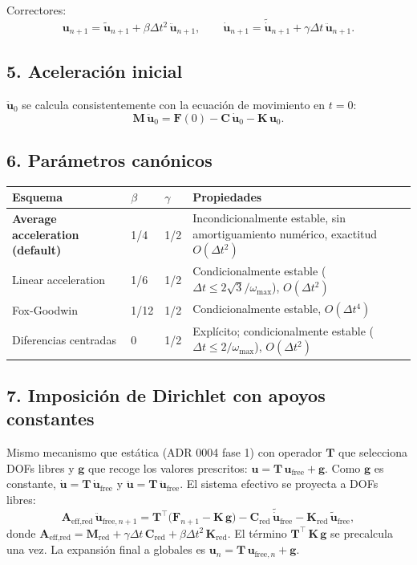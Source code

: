 \documentclass[11pt,letterpaper,oneside]{report}
\begin{document}
Correctores:
\[
\mathbf u_{n+1} = \tilde{\mathbf u}_{n+1} + \beta\Delta t^2\,\ddot{\mathbf u}_{n+1}, \qquad
  \dot{\mathbf u}_{n+1} = \tilde{\dot{\mathbf u}}_{n+1} + \gamma\Delta t\,\ddot{\mathbf u}_{n+1}.
\]

\subsection{5. Aceleración inicial}
$\ddot{\mathbf u}_0$ se calcula consistentemente con la ecuación de movimiento en $t = 0$:
\[
\mathbf M\,\ddot{\mathbf u}_0 = \mathbf F(0) - \mathbf C\,\dot{\mathbf u}_0 - \mathbf K\,\mathbf u_0.
\]

\subsection{6. Parámetros canónicos}
\begin{center}
\begin{tabularx}{\textwidth}{YYYY}
\hline
\textbf{Esquema} & \textbf{\ensuremath{\beta}} & \textbf{\ensuremath{\gamma}} & \textbf{Propiedades} \\
\hline
\textbf{Average acceleration (default)} & 1/4 & 1/2 & Incondicionalmente estable, sin amortiguamiento numérico, exactitud $O(\Delta t^2)$ \\
Linear acceleration & 1/6 & 1/2 & Condicionalmente estable ($\Delta t \le 2\sqrt{3}/\omega_{\max}$), $O(\Delta t^2)$ \\
Fox-Goodwin & 1/12 & 1/2 & Condicionalmente estable, $O(\Delta t^4)$ \\
Diferencias centradas & 0 & 1/2 & Explícito; condicionalmente estable ($\Delta t \le 2/\omega_{\max}$), $O(\Delta t^2)$ \\
\hline
\end{tabularx}
\end{center}
\subsection{7. Imposición de Dirichlet con apoyos constantes}
Mismo mecanismo que estática (ADR 0004 fase 1) con operador $\mathbf T$ que selecciona DOFs libres y $\mathbf g$ que recoge los valores prescritos: $\mathbf u = \mathbf T\,\mathbf u_\text{free} + \mathbf g$. Como $\mathbf g$ es constante, $\dot{\mathbf u} = \mathbf T\,\dot{\mathbf u}_\text{free}$ y $\ddot{\mathbf u} = \mathbf T\,\ddot{\mathbf u}_\text{free}$. El sistema efectivo se proyecta a DOFs libres:
\[
\mathbf A_\text{eff,red}\,\ddot{\mathbf u}_{\text{free},n+1} = \mathbf T^\top\bigl(\mathbf F_{n+1} - \mathbf K\,\mathbf g\bigr) - \mathbf C_\text{red}\,\tilde{\dot{\mathbf u}}_\text{free} - \mathbf K_\text{red}\,\tilde{\mathbf u}_\text{free},
\]
donde $\mathbf A_\text{eff,red} = \mathbf M_\text{red} + \gamma\Delta t\,\mathbf C_\text{red} + \beta\Delta t^2\,\mathbf K_\text{red}$. El término $\mathbf T^\top\,\mathbf K\,\mathbf g$ se precalcula una vez. La expansión final a globales es $\mathbf u_n = \mathbf T\,\mathbf u_{\text{free},n} + \mathbf g$.
\end{document}
